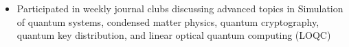 

\begin{itemize}
    \item Participated in weekly journal clubs discussing advanced topics in Simulation of quantum systems, condensed matter physics, quantum cryptography, quantum key distribution, and linear optical quantum computing (LOQC)

\end{itemize}

